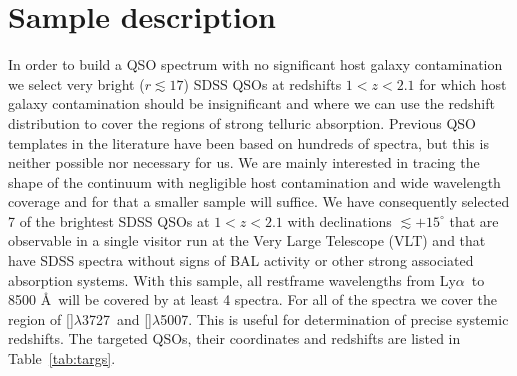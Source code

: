 \documentclass{aa}    %
\newcommand{\Tab}[1]{Table~\ref{tab:#1}}
\newcommand{\tab}[1]{\Tab{#1}}
\newcommand{\sectlabel}[1]{\label{sect:#1}}
\newcommand{\lya}{Ly$\alpha$}
\newcommand{\oii}{[\ion{O}{ii}]$\lambda$3727}
\newcommand{\oiii}{[\ion{O}{iii}]$\lambda$5007}
\begin{document}
\section{Sample description}   \sectlabel{sample}


In order to build a QSO spectrum with no significant host galaxy contamination we select very bright ($r \lesssim 17$) SDSS QSOs at redshifts $1 < z < 2.1$ for which host galaxy contamination should be insignificant and where we can use the redshift distribution to cover the regions of strong telluric absorption. Previous QSO templates in the literature have been based on hundreds of spectra, but this is neither possible nor necessary for us. We are mainly interested in tracing the shape of the continuum with negligible host contamination and wide wavelength coverage and for that a smaller sample will suffice. We have consequently selected 7 of the brightest SDSS QSOs at $1 < z < 2.1$ with declinations $\lesssim +15^\circ$ that are observable in a single visitor run at the Very Large Telescope (VLT) and that have SDSS spectra without signs of BAL activity or other strong associated absorption systems. With this sample, all restframe wavelengths from \lya~to 8500 \AA~will be covered by at least 4 spectra. For all of the spectra we cover the region of \oii~and \oiii. This is useful for determination of precise systemic redshifts. The targeted QSOs, their coordinates and redshifts are listed in \tab{targs}.
\end{document}

